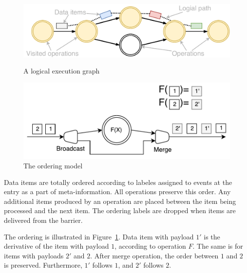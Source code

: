 \begin{figure}[ht]
  \centering
  \begin{minipage}[b]{.5\textwidth}
    \centering
    \includegraphics[width=0.9\linewidth]{pics/logical-graph}
    \caption{A logical execution  graph}
    \label{logical-graph-figure}
  \end{minipage}%
  \begin{minipage}[b]{.5\textwidth}
    \centering
    \includegraphics[width=\linewidth]{pics/ordering}
    \caption{The ordering model}
    \label{ordering}
  \end{minipage}
\end{figure}

Data items are totally ordered according to labeles assigned to events at the entry as a part of meta-information. All operations preserve this order. Any additional items produced by an operation are placed between the item being processed and the next item. The ordering labels are dropped when items are delivered from the barrier. 

The ordering is illustrated  in Figure~\ref{ordering}. Data item with payload $1'$ is the derivative of the item with payload $1$, according to operation $F$. The same is for items with payloads $2'$ and $2$. After merge operation, the order between $1$ and $2$ is preserved. Furthermore, $1'$ follows $1$, and $2'$ follows $2$.  



